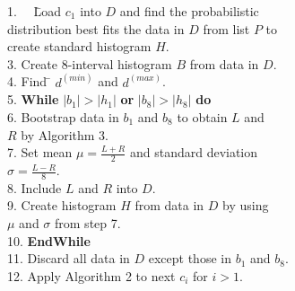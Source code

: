 \documentclass[a4paper,fleqn]{cas-dc}
\begin{document}
\begin{tabbing}
1.~~ \= Load $c_{1}$ into $D$ and find the probabilistic \\
     \> distribution best fits the data in $D$ from list $P$ to \\
     \> create standard histogram $H$. \\
3.   \> Create 8-interval histogram $B$ from data in $D$. \\
4.   \> Find \= $d^{(min)}$ and $d^{(max)}$. \\
5.   \> {\bf While} $|b_{1}| > |h_{1}|$ {\bf or} $|b_{8}| > |h_{8}|$ {\bf do} \\
6.   \>        \> Bootstrap data in $b_{1}$ and $b_{8}$ to obtain $L$ and \\
     \>        \> $R$ by Algorithm 3. \\
7.   \>        \> Set mean $\mu = \frac{L + R}{2}$ and standard deviation \\
     \>        \> $\sigma = \frac{L - R}{8}$. \\
8.   \>        \> Include $L$ and $R$ into $D$. \\
9.   \>        \> Create histogram $H$ from data in $D$ by using \\
     \>        \> $\mu$ and $\sigma$ from step 7. \\
10.   \> {\bf EndWhile} \\
11.  \> Discard all data in $D$ except those in $b_{1}$ and $b_{8}$. \\
12.  \> Apply Algorithm 2 to next $c_{i}$ for $i > 1$.
\end{tabbing}
\end{document}
